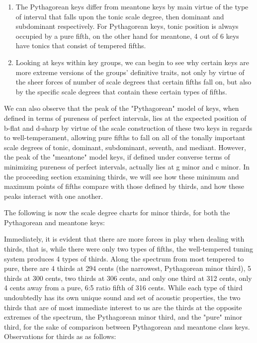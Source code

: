 \begin{enumerate}
\def\labelenumi{\arabic{enumi}.}
\tightlist
\item
  The Pythagorean keys differ from meantone keys by main virtue of the
  type of interval that falls upon the tonic scale degree, then dominant
  and subdominant respectively. For Pythagorean keys, tonic position is
  always occupied by a pure fifth, on the other hand for meantone, 4 out
  of 6 keys have tonics that consist of tempered fifths.
\item
  Looking at keys within key groups, we can begin to see why certain
  keys are more extreme versions of the groups' definitive traits, not
  only by virtue of the sheer forces of number of scale degrees that
  certain fifths fall on, but also by the specific scale degrees that
  contain these certain types of fifths.
\end{enumerate}

We can also observe that the peak of the "Pythagorean" model of keys,
when defined in terms of pureness of perfect intervals, lies at the
expected position of b-flat and d-sharp by virtue of the scale
construction of these two keys in regards to well-temperament, allowing
pure fifths to fall on all of the tonally important scale degrees of
tonic, dominant, subdominant, seventh, and mediant. However, the peak of
the "meantone" model keys, if defined under converse terms of minimizing
pureness of perfect intervals, actually lies at g minor and c minor. In
the proceeding section examining thirds, we will see how these minimum
and maximum points of fifths compare with those defined by thirds, and
how these peaks interact with one another.

The following is now the scale degree charts for minor thirds, for both
the Pythagorean and meantone keys:


    \begin{center}
    \end{center}
    

    \begin{center}
    \end{center}
    
    Immediately, it is evident that there are more forces in play when
dealing with thirds, that is, while there were only two types of fifths,
the well-tempered tuning system produces 4 types of thirds. Along the
spectrum from most tempered to pure, there are 4 thirds at 294 cents
(the narrowest, Pythagorean minor third), 5 thirds at 300 cents, two
thirds at 306 cents, and only one third at 312 cents, only 4 cents away
from a pure, 6:5 ratio fifth of 316 cents. While each type of third
undoubtedly has its own unique sound and set of acoustic properties, the
two thirds that are of most immediate interest to us are the thirds at
the opposite extremes of the spectrum, the Pythagorean minor third, and
the "pure" minor third, for the sake of comparison between Pythagorean
and meantone class keys. Observations for thirds as as follows:

